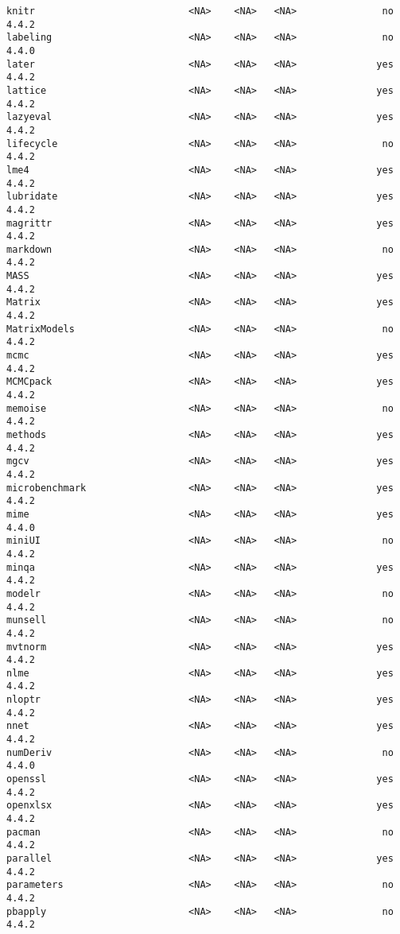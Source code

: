 \documentclass[
  letterpaper,
  DIV=11,
  numbers=noendperiod]{scrreprt}
\begin{document}
\begin{verbatim}
knitr                           <NA>    <NA>   <NA>               no 4.4.2
labeling                        <NA>    <NA>   <NA>               no 4.4.0
later                           <NA>    <NA>   <NA>              yes 4.4.2
lattice                         <NA>    <NA>   <NA>              yes 4.4.2
lazyeval                        <NA>    <NA>   <NA>              yes 4.4.2
lifecycle                       <NA>    <NA>   <NA>               no 4.4.2
lme4                            <NA>    <NA>   <NA>              yes 4.4.2
lubridate                       <NA>    <NA>   <NA>              yes 4.4.2
magrittr                        <NA>    <NA>   <NA>              yes 4.4.2
markdown                        <NA>    <NA>   <NA>               no 4.4.2
MASS                            <NA>    <NA>   <NA>              yes 4.4.2
Matrix                          <NA>    <NA>   <NA>              yes 4.4.2
MatrixModels                    <NA>    <NA>   <NA>               no 4.4.2
mcmc                            <NA>    <NA>   <NA>              yes 4.4.2
MCMCpack                        <NA>    <NA>   <NA>              yes 4.4.2
memoise                         <NA>    <NA>   <NA>               no 4.4.2
methods                         <NA>    <NA>   <NA>              yes 4.4.2
mgcv                            <NA>    <NA>   <NA>              yes 4.4.2
microbenchmark                  <NA>    <NA>   <NA>              yes 4.4.2
mime                            <NA>    <NA>   <NA>              yes 4.4.0
miniUI                          <NA>    <NA>   <NA>               no 4.4.2
minqa                           <NA>    <NA>   <NA>              yes 4.4.2
modelr                          <NA>    <NA>   <NA>               no 4.4.2
munsell                         <NA>    <NA>   <NA>               no 4.4.2
mvtnorm                         <NA>    <NA>   <NA>              yes 4.4.2
nlme                            <NA>    <NA>   <NA>              yes 4.4.2
nloptr                          <NA>    <NA>   <NA>              yes 4.4.2
nnet                            <NA>    <NA>   <NA>              yes 4.4.2
numDeriv                        <NA>    <NA>   <NA>               no 4.4.0
openssl                         <NA>    <NA>   <NA>              yes 4.4.2
openxlsx                        <NA>    <NA>   <NA>              yes 4.4.2
pacman                          <NA>    <NA>   <NA>               no 4.4.2
parallel                        <NA>    <NA>   <NA>              yes 4.4.2
parameters                      <NA>    <NA>   <NA>               no 4.4.2
pbapply                         <NA>    <NA>   <NA>               no 4.4.2

\end{verbatim}
\end{document}
